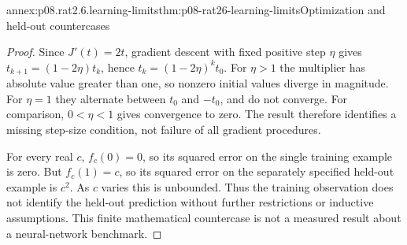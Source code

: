 \begin{annexitem}{annex:p08.rat2.6.learning-limits}{thm:p08-rat26-learning-limits}{Optimization and held-out countercases}
\begin{proof}
Since \(J'(t)=2t\), gradient descent with fixed positive step
\(\eta\) gives \(t_{k+1}=(1-2\eta)t_k\), hence
\(t_k=(1-2\eta)^k t_0\). For \(\eta>1\) the multiplier
has absolute value greater than one, so nonzero initial values
diverge in magnitude. For \(\eta=1\) they alternate between
\(t_0\) and \(-t_0\), and do not converge. For comparison,
\(0<\eta<1\) gives convergence to zero. The result therefore
identifies a missing step-size condition, not failure of all gradient
procedures.

For every real \(c\), \(f_c(0)=0\), so its squared error on
the single training example is zero. But \(f_c(1)=c\), so its
squared error on the separately specified held-out example is \(c^2\).
As \(c\) varies this is unbounded. Thus the training observation
does not identify the held-out prediction without further restrictions
or inductive assumptions. This finite mathematical countercase is
not a measured result about a neural-network benchmark.
\end{proof}
\end{annexitem}
